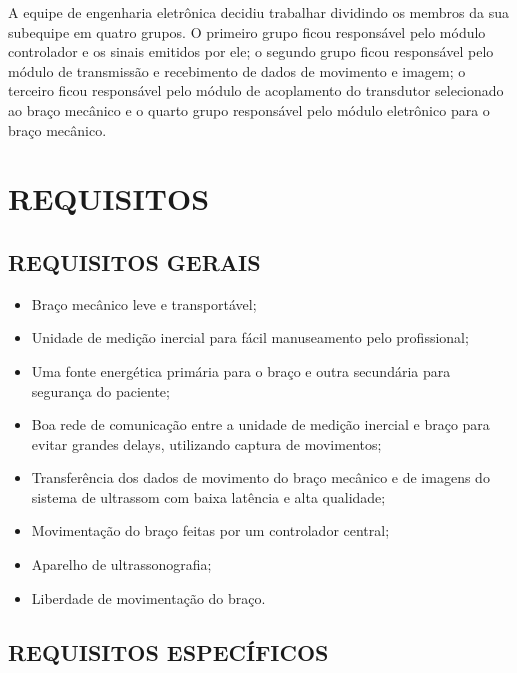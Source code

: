 	A equipe de engenharia eletrônica decidiu trabalhar dividindo os membros da sua subequipe em quatro grupos. O primeiro grupo ficou responsável pelo módulo controlador e os sinais emitidos por ele; o segundo grupo ficou responsável pelo módulo de transmissão e recebimento de dados de movimento e imagem; o terceiro ficou responsável pelo módulo de acoplamento do transdutor selecionado ao braço mecânico e o quarto grupo responsável pelo módulo eletrônico para o braço mecânico.	 

\section{REQUISITOS}

\subsection{REQUISITOS GERAIS}

\begin{itemize}
\item Braço mecânico leve e transportável;
\item Unidade de medição inercial para fácil manuseamento pelo profissional;
\item Uma fonte energética primária para o braço e outra secundária para segurança do paciente;
\item Boa rede de comunicação entre a unidade de medição inercial e braço para evitar grandes delays, utilizando captura de movimentos;
\item Transferência dos dados de movimento do braço mecânico e de imagens do sistema de ultrassom com baixa latência e alta qualidade;
\item Movimentação do braço feitas por um controlador central;
\item Aparelho de ultrassonografia;
\item Liberdade de movimentação do braço.
\end{itemize}

\subsection{REQUISITOS ESPECÍFICOS}

